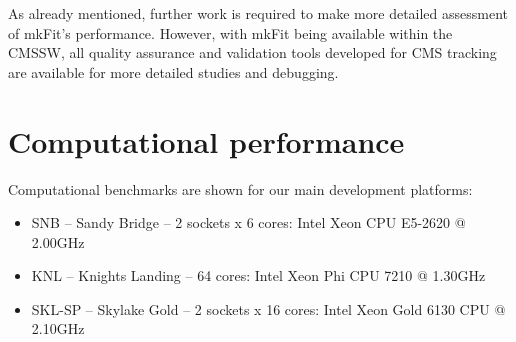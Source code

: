 \documentclass{webofc}
\def\mkfit{mkFit\xspace}
\begin{document}

As already mentioned, further work is required to make more detailed
assessment of \mkfit's performance. However, with \mkfit being available
within the CMSSW, all quality assurance and validation tools developed for CMS
tracking are available for more detailed studies and debugging.



\section{Computational performance}
\label{sec:comp-perf}


Computational benchmarks are shown for our main development platforms:

\begin{itemize}

\item SNB -- Sandy Bridge -- 2 sockets x 6 cores: Intel Xeon CPU E5-2620 @ 2.00GHz

\item KNL -- Knights Landing -- 64 cores: Intel Xeon Phi CPU 7210 @ 1.30GHz

\item SKL-SP -- Skylake Gold -- 2 sockets x 16 cores: Intel Xeon Gold 6130 CPU @ 2.10GHz

\end{itemize}
\end{document}
